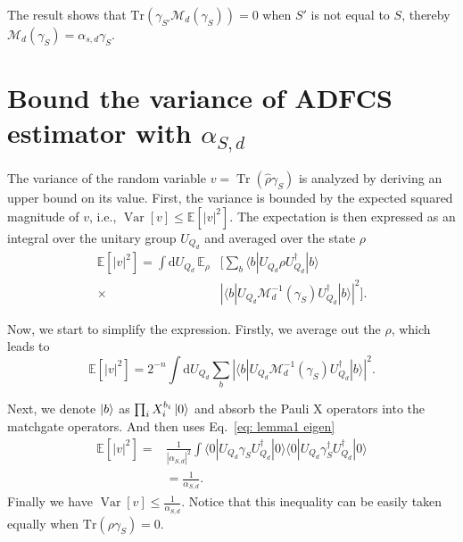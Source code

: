 \documentclass[showpacs,twocolumn,aps,prx,long bibliography,superscriptaddress,notitlepage]{revtex4-1}
\newcommand{\tra}[1]{\text{Tr}\left( #1 \right)}
\newcommand{\Var}{\mathop{\mathrm{Var}}}
\begin{document}
The result shows that $\tra{\gamma_{S'} \mathcal{M}_d(\gamma_S)} = 0$ when $S'$ is not equal to $ S$, thereby $\mathcal{M}_d (\gamma_S) = \alpha_{s,d} \gamma_S$.



\section{Bound the variance of ADFCS estimator with $\alpha_{S,d}$}
\label{appendix: bound variance}


The variance of the random variable $ v = \operatorname{Tr}(\hat{\rho} \gamma_S) $ is analyzed by deriving an upper bound on its value. First, the variance is bounded by the expected squared magnitude of $ v $, i.e., $ \Var[v] \leq \mathbb{E}[|v|^2] $. The expectation is then expressed as an integral over the unitary group $ U_{Q_d} $ and averaged over the state $ \rho $
\begin{equation}
\begin{aligned}
    \mathbb{E}[|v|^2] = \int \mathrm{d}U_{Q_d} \, \mathbb{E}_{\rho} & \Big[\sum_b \langle b|U_{Q_d} \rho U_{Q_d}^\dagger|b \rangle \\ 
     \times & \left|\langle b|U_{Q_d} \mathcal{M}_d^{-1}(\gamma_S) U_{Q_d}^\dagger|b \rangle\right|^2\Big].
\end{aligned}
\end{equation}

Now, we start to simplify the expression.
Firstly, we average out the $\rho$, which leads to
\begin{equation}
    \mathbb{E}[|v|^2] = 2^{-n} \int \mathrm{d}U_{Q_d} \sum_b \left|\langle b|U_{Q_d} \mathcal{M}_d^{-1}(\gamma_S) U_{Q_d}^\dagger|b \rangle\right|^2.
\end{equation}

Next, we denote $\ket{b}$ as $\prod_i X_i^{b_i}\ket{0}$ and absorb the Pauli X operators into the matchgate operators.                                          
And then uses Eq.~\eqref{eq: lemma1 eigen}
\begin{align}
    \mathbb{E}[|v|^2] =& \frac{1}{|\alpha_{S,d}|^2} \int \langle 0|U_{Q_d} \gamma_S U_{Q_d}^\dagger|0 \rangle \langle 0|U_{Q_d} \gamma_S^\dagger U_{Q_d}^\dagger|0 \rangle \\
 &=\frac{1}{\alpha_{S,d}}.
\end{align}
Finally we have $\Var[v] \leq \frac{1}{\alpha_{S,d}}$. 
Notice that this inequality can be easily taken equally when $\tra{\rho \gamma_S} = 0$.
\end{document}
